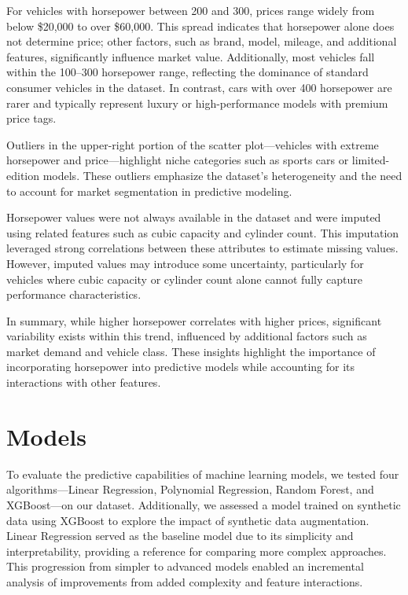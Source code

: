 \documentclass[a4paper,oneside,bibliography=totoc]{scrbook}
\begin{document}
For vehicles with horsepower between 200 and 300, prices range widely from below \$20,000 to over \$60,000. This spread indicates that horsepower alone does not determine price; other factors, such as brand, model, mileage, and additional features, significantly influence market value. Additionally, most vehicles fall within the 100--300 horsepower range, reflecting the dominance of standard consumer vehicles in the dataset. In contrast, cars with over 400 horsepower are rarer and typically represent luxury or high-performance models with premium price tags.

Outliers in the upper-right portion of the scatter plot---vehicles with extreme horsepower and price---highlight niche categories such as sports cars or limited-edition models. These outliers emphasize the dataset's heterogeneity and the need to account for market segmentation in predictive modeling.

Horsepower values were not always available in the dataset and were imputed using related features such as cubic capacity and cylinder count. This imputation leveraged strong correlations between these attributes to estimate missing values. However, imputed values may introduce some uncertainty, particularly for vehicles where cubic capacity or cylinder count alone cannot fully capture performance characteristics.

In summary, while higher horsepower correlates with higher prices, significant variability exists within this trend, influenced by additional factors such as market demand and vehicle class. These insights highlight the importance of incorporating horsepower into predictive models while accounting for its interactions with other features.

\chapter{Models}
\label{cha:models}

To evaluate the predictive capabilities of machine learning models, we tested four algorithms---Linear Regression, Polynomial Regression, Random Forest, and XGBoost---on our dataset. Additionally, we assessed a model trained on synthetic data using XGBoost to explore the impact of synthetic data augmentation. Linear Regression served as the baseline model due to its simplicity and interpretability, providing a reference for comparing more complex approaches. This progression from simpler to advanced models enabled an incremental analysis of improvements from added complexity and feature interactions.
\end{document}
